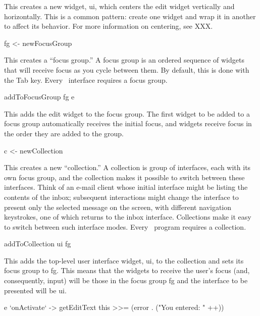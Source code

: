 This creates a new widget, ui, which centers the edit widget vertically
and horizontally.  This is a common pattern: create one widget and wrap
it in another to affect its behavior.  For more information on
centering, see XXX.

\begin{haskellcode}
 fg <- newFocusGroup
\end{haskellcode}

This creates a “focus group.”  A focus group is an ordered sequence of
widgets that will receive focus as you cycle between them.  By
default, this is done with the Tab key.  Every \vtyui\ interface
requires a focus group.

\begin{haskellcode}
 addToFocusGroup fg e
\end{haskellcode}

This adds the edit widget to the focus group.  The first widget to be
added to a focus group automatically receives the initial focus, and
widgets receive focus in the order they are added to the group.

\begin{haskellcode}
 c <- newCollection
\end{haskellcode}

This creates a new “collection.”  A collection is group of interfaces,
each with its own focus group, and the collection makes it possible to
switch between these interfaces.  Think of an e-mail client whose
initial interface might be listing the contents of the inbox;
subsequent interactions might change the interface to present only the
selected message on the screen, with different navigation keystrokes,
one of which returns to the inbox interface.  Collections make it easy
to switch between such interface modes.  Every \vtyui\ program
requires a collection.

\begin{haskellcode}
 addToCollection ui fg
\end{haskellcode}

This adds the top-level user interface widget, ui, to the collection and
sets its focus group to fg.  This means that the widgets to receive the
user’s focus (and, consequently, input) will be those in the focus group
fg and the interface to be presented will be ui.

\begin{haskellcode}
 e `onActivate` \this -> getEditText this >>=
   (error . ("You entered: " ++))
\end{haskellcode}

